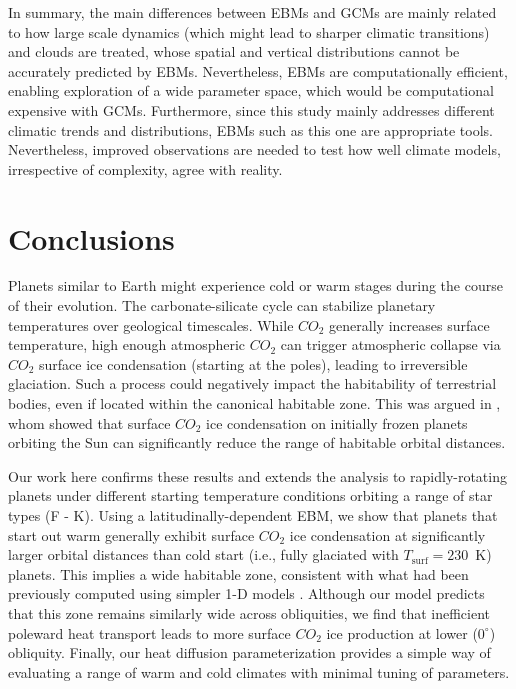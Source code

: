 \documentclass[fleqn,usenatbib]{mnras}
\begin{document}
In summary, the main differences between EBMs and GCMs are mainly related to how large scale dynamics (which might lead to sharper climatic transitions) and clouds are treated, whose spatial and vertical distributions cannot be accurately predicted by EBMs. Nevertheless, EBMs are computationally efficient,  enabling exploration of a wide parameter space, which would be computational expensive with GCMs. Furthermore, since this study mainly addresses different climatic trends and distributions, EBMs such as this one are appropriate tools. 
Nevertheless, improved observations are needed to test how well climate models, irrespective of complexity, agree with reality.

\section{Conclusions}
Planets similar to Earth might experience cold or warm stages during the course of their evolution. The carbonate-silicate cycle can stabilize planetary temperatures over geological timescales. While  $CO_{\mathrm{2}}$ generally increases surface temperature, high enough atmospheric $CO_{\mathrm{2}}$ can trigger atmospheric collapse via $CO_{\mathrm{2}}$ surface ice condensation (starting at the poles), leading to irreversible glaciation. Such a process could negatively impact the habitability of terrestrial bodies, even if located within the canonical habitable zone. This was argued in \citet{Turbet2017}, whom showed that surface $CO_{\mathrm{2}}$ ice condensation on initially frozen planets orbiting the Sun can significantly reduce the range of habitable orbital distances. 

Our work here confirms these results and extends the analysis to rapidly-rotating planets under different starting temperature conditions orbiting a range of star types (F - K). Using a latitudinally-dependent EBM, we show that planets that start out warm generally exhibit surface $CO_{\mathrm{2}}$ ice condensation at significantly larger orbital distances than cold start (i.e., fully glaciated with $T_{\mathrm{surf}}=230$~K) planets. This implies a wide habitable zone, consistent with what had been previously computed using simpler 1-D models \citep{kasting1993,KumarKopparapu2013,Ramirez2018}. Although our model predicts that this zone remains similarly wide across obliquities, we find that inefficient poleward heat transport leads to more surface  $CO_{\mathrm{2}}$ ice production at lower ($0^{\circ}$) obliquity. Finally, our heat diffusion parameterization provides a simple way of evaluating a range of warm and cold climates with minimal tuning of parameters. 
\end{document}
